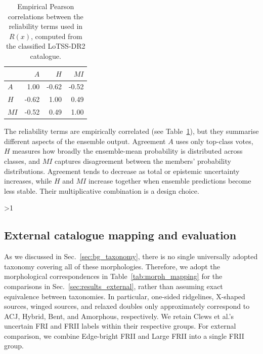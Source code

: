 \begin{table}
\begin{minipage}{\linewidth}
\centering
\small
{}
\begin{tabular}{lrrr}
\toprule
 & \(A\) & \(H\) & \(MI\) \\
\midrule
\(A\)  & 1.00 & -0.62 & -0.52 \\
\(H\)  & -0.62 & 1.00 & 0.49 \\
\(MI\) & -0.52 & 0.49 & 1.00 \\
\bottomrule
\end{tabular}
\footnotesize
\caption[Correlations between ensemble reliability measures]{Empirical Pearson correlations between the reliability terms used in \(R(x)\), computed from the classified LoTSS-DR2 catalogue. }
\label{tab:reliability_corr}
\end{minipage}
\end{table}
The reliability terms are empirically correlated (see Table~\ref{tab:reliability_corr}), but they summarise different aspects of the ensemble output. Agreement \(A\) uses only top-class votes, \(H\) measures how broadly the ensemble-mean probability is distributed across classes, and \(MI\) captures disagreement between the members’ probability distributions. Agreement tends to decrease as total or epistemic uncertainty increases, while \(H\) and \(MI\) increase together when ensemble predictions become less stable. Their multiplicative combination is a design choice.
\par
\ifnum\value{WF@wrappedlines}>1
  \vspace{\dimexpr\value{WF@wrappedlines}\baselineskip-\baselineskip\relax}
\fi
\WFclear

\subsection{External catalogue mapping and evaluation}
\label{sec:method_external_mapping}
\label{sec:bg_eval_metrics}

As we discussed in Sec.~\ref{sec:bg_taxonomy}, there is no single universally adopted taxonomy covering all of these morphologies. Therefore, we adopt the morphological correspondences in Table~\ref{tab:morph_mapping} for the comparisons in Sec.~\ref{sec:results_external}, rather than assuming exact equivalence between taxonomies.
In particular, one-sided ridgelines, X-shaped sources, winged sources, and relaxed doubles only approximately correspond to ACJ, Hybrid, Bent, and Amorphous, respectively.
We retain Clews et al.'s uncertain FRI and FRII labels within their respective groups. For external comparison, we combine Edge-bright FRII and Large FRII into a single FRII group.

